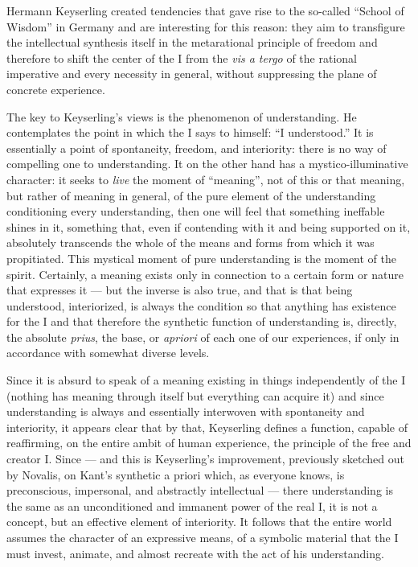 Hermann Keyserling created tendencies that gave rise to the so-called ``School of Wisdom'' in Germany and are interesting for this reason: they aim to transfigure the intellectual synthesis itself in the metarational principle of freedom and therefore to shift the center of the I from the \emph{vis a tergo} of the rational imperative and every necessity in general, without suppressing the plane of concrete experience.

The key to Keyserling's views is the phenomenon of understanding. He contemplates the point in which the I says to himself: ``I understood.'' It is essentially a point of spontaneity, freedom, and interiority: there is no way of compelling one to understanding. It on the other hand has a mystico-illuminative character: it seeks to \emph{live} the moment of ``meaning'', not of this or that meaning, but rather of meaning in general, of the pure element of the understanding conditioning every understanding, then one will feel that something ineffable shines in it, something that, even if contending with it and being supported on it, absolutely transcends the whole of the means and forms from which it was propitiated. This mystical moment of pure understanding is the moment of the spirit. Certainly, a meaning exists only in connection to a certain form or nature that expresses it --- but the inverse is also true, and that is that being understood, interiorized, is always the condition so that anything has existence for the I and that therefore the synthetic function of understanding is, directly, the absolute \emph{prius}, the base, or \emph{apriori} of each one of our experiences, if only in accordance with somewhat diverse levels.

Since it is absurd to speak of a meaning existing in things independently of the I (nothing has meaning through itself but everything can acquire it) and since understanding is always and essentially interwoven with spontaneity and interiority, it appears clear that by that, Keyserling defines a function, capable of reaffirming, on the entire ambit of human experience, the principle of the free and creator I. Since --- and this is Keyserling's improvement, previously sketched out by Novalis, on Kant's synthetic a priori which, as everyone knows, is preconscious, impersonal, and abstractly intellectual --- there understanding is the same as an unconditioned and immanent power of the real I, it is not a concept, but an effective element of interiority. It follows that the entire world assumes the character of an expressive means, of a symbolic material that the I must invest, animate, and almost recreate with the act of his understanding.


